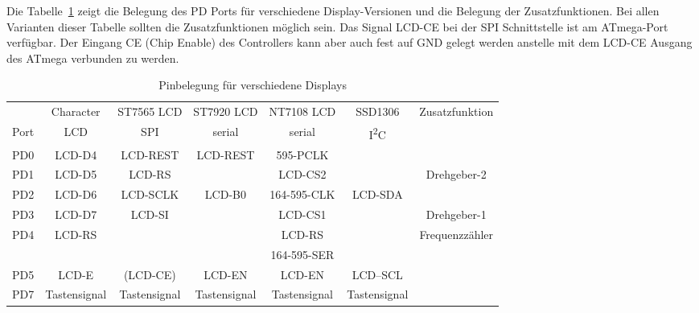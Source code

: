 Die Tabelle~\ref{tab:display-con} zeigt die Belegung des PD Ports für verschiedene Display-Versionen
und die Belegung der Zusatzfunktionen.
Bei allen Varianten dieser Tabelle sollten die Zusatzfunktionen möglich sein.
Das Signal LCD-CE bei der SPI Schnittstelle ist am ATmega-Port verfügbar. Der Eingang CE (Chip Enable) des
Controllers kann aber auch fest auf GND gelegt werden anstelle mit dem LCD-CE Ausgang des ATmega verbunden zu werden.

\begin{table}[H]
  \begin{center}
    \begin{tabular}{| c || c | c | c | c | c | c |}
    \hline
           & Character     & ST7565 LCD & ST7920 LCD     & NT7108 LCD  & SSD1306     & Zusatzfunktion \\
      Port & LCD           &   SPI      & serial         & serial      &   I\textsuperscript{2}C      & \\
    \hline
    \hline
    PD0    &  LCD-D4       &  LCD-REST  & LCD-REST       & 595-PCLK        &            & \\
    \hline
    PD1    &  LCD-D5       &  LCD-RS    &                & LCD-CS2     &             & Drehgeber-2 \\
    \hline
    PD2    &  LCD-D6       &  LCD-SCLK  & LCD-B0         & 164-595-CLK &  LCD-SDA    & \\
    \hline
    PD3    &  LCD-D7       &  LCD-SI    &                & LCD-CS1     &             & Drehgeber-1 \\
    \hline
    PD4    &  LCD-RS       &            &                & LCD-RS      &             & Frequenzzähler \\
           &               &            &                & 164-595-SER &             &                \\
    \hline
    PD5    &  LCD-E        &  (LCD-CE)  & LCD-EN         & LCD-EN      &   LCD--SCL  & \\
    \hline
    PD7    & Tastensignal & Tastensignal & Tastensignal  & Tastensignal & Tastensignal & \\
    \hline
    \end{tabular}
  \end{center}
  \caption{Pinbelegung für verschiedene Displays}
  \label{tab:display-con}
\end{table}

